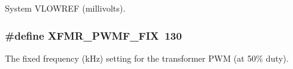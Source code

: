 System V\-L\-O\-W\-R\-E\-F (millivolts). \hypertarget{a00043_a39c57f59314d3cc076ca98898f227b46}{
\subsubsection[{X\-F\-M\-R\-\_\-\-P\-W\-M\-F\-\_\-\-F\-I\-X}]{\setlength{\rightskip}{0pt plus 5cm}\#define X\-F\-M\-R\-\_\-\-P\-W\-M\-F\-\_\-\-F\-I\-X~130}}\label{a00043_a39c57f59314d3cc076ca98898f227b46}
The fixed frequency (k\-Hz) setting for the transformer P\-W\-M (at 50\% duty). 